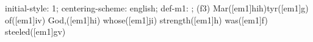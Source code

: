 initial-style: 1;
centering-scheme: english;
def-m1: \grealign;
(f3) Mar([em1]hih)tyr([em1]g) of([em1]iv) God,([em1]hi) whose([em1]ji) strength([em1]h) was([em1]f) steeled([em1]gv)